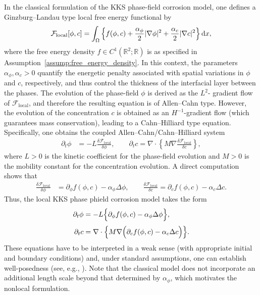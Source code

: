 \documentclass[]{article}
\newcommand{\R}{\mathbb{R}}
\newcommand{\dx}{\,\textup{d}x}
\begin{document}
In the classical formulation of the KKS phase-field corrosion model, one defines a Ginzburg--Landau type local free energy functional by
\[
\mathcal{F}_{\mathrm{local}}[\phi,c] = \int_\Omega \Big\{ f(\phi,c) + \frac{\alpha_\phi}{2} |\nabla \phi|^2 + \frac{\alpha_c}{2} |\nabla c|^2 \Big\}\dx,
\]
where the free energy density $f \in C^1(\R^2;\R)$ is as specified in Assumption~\ref{assump:free_energy_density}. In this context, the parameters \(\alpha_\phi,\alpha_c>0\) quantify the energetic penalty associated with spatial variations in \(\phi\) and $c$, respectively, and thus control the thickness of the interfacial layer between the phases. The evolution of the phase-field $\phi$ is derived as the \(L^2\)- gradient flow of \(\mathcal{F}_{\mathrm{local}}\), and therefore the resulting equation is of Allen--Cahn type. However, the evolution of the concentration $c$ is obtained as an \(H^{-1}\)-gradient flow (which guarantees mass conservation), leading to a Cahn--Hilliard type equation. Specifically, one obtains the coupled Allen--Cahn/Cahn--Hilliard system
\begin{equation} \label{Eq:GradientFlowACCH}
	\begin{aligned}
		\partial_t \phi &= -L\frac{\delta \mathcal{F}_{\mathrm{local}}}{\delta \phi}, \qquad 
		\partial_t c = \nabla\cdot \left\{ M\nabla\frac{\delta \mathcal{F}_{\mathrm{local}}}{\delta c} \right\},
	\end{aligned}
\end{equation}
where \(L>0\) is the kinetic coefficient for the phase-field evolution and \(M>0\) is the mobility constant for the concentration evolution. A direct computation shows that
\[
\begin{aligned}
	\frac{\delta \mathcal{F}_{\mathrm{local}}}{\delta \phi} &= \partial_\phi f(\phi,c) - \alpha_\phi\Delta \phi, \qquad 
	\frac{\delta \mathcal{F}_{\mathrm{local}}}{\delta c} = \partial_c f(\phi,c)- \alpha_c\Delta c.
\end{aligned}
\]
Thus, the local KKS phase phield corrosion model takes the form
\begin{align}
	\partial_t \phi &= -L\Bigl\{\partial_\phi f(\phi,c) - \alpha_\phi\Delta\phi\Bigr\}, \label{eq:localAC}\\[1mm]
	\partial_t c &= \nabla\cdot\Bigl\{ M\nabla\Bigl(\partial_c f(\phi,c)- \alpha_c\Delta c\Bigr) \Bigr\}. \label{eq:localCH}
\end{align}
These equations have to be interpreted in a weak sense (with appropriate initial and boundary conditions) and, under standard assumptions, one can establish well-posedness (see, e.g., \cite{mai2016phase}). Note that the classical model does not incorporate an additional length scale beyond that determined by \(\alpha_\phi\), which motivates the nonlocal formulation.
\end{document}
